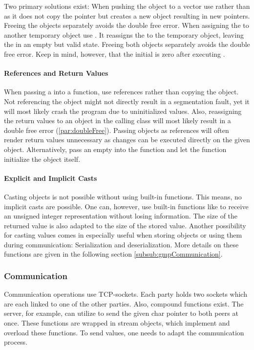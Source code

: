 Two primary solutions exist:
When pushing the  object to a vector use  rather than  as it does not copy the pointer but creates a new object resulting in new pointers.
Freeing the objects separately avoids the double free error.
When assigning the  to another temporary object use .
It reassigns the  to the temporary object, leaving the  in an empty but valid state.
Freeing both objects separately avoids the double free error.
Keep in mind, however, that the initial  is zero after executing .

\paragraph{References and Return Values}\label{par:referencesAndReturnValues}
When passing a  into a function, use references rather than copying the object.
Not referencing the object might not directly result in a segmentation fault, yet it will most likely crash the program due to uninitialized values.
Also, reassigning the return values to an object in the calling class will most likely result in a double free error (\ref{par:doubleFree}).
Passing objects as references will often render return values unnecessary as changes can be executed directly on the given object.
Alternatively, pass an empty  into the function and let the function initialize the object itself.

\paragraph{Explicit and Implicit Casts}\label{par:mpzExplicitAndImplicitCasts}
Casting  objects is not possible without using built-in functions.
This means, no implicit casts are possible.
One can, however, use built-in functions like  to receive an unsigned integer representation without losing information.
The size of the returned value is also adapted to the size of the stored value.
Another possibility for casting values comes in especially useful when storing  objects or using them during communication:
Serialization and deserialization.
More details on these functions are given in the following section \ref{subsub:gmpCommunication}.

\subsubsection*{Communication}\label{subsub:gmpCommunication}
Communication operations use TCP-sockets.
Each party holds two sockets which are each linked to one of the other parties.
Also, compound functions exist.
The server, for example, can utilize  to send the given char pointer to both peers at once.
These functions are wrapped in stream objects, which implement and overload these functions.
To send  values, one needs to adapt the communication process.


